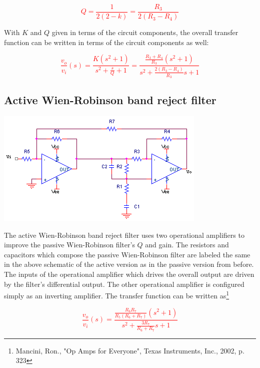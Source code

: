 \textcolor{red}{
\begin{equation}
Q = \frac{1}{2(2-k)} = \frac{R_{3}}{2(R_{3}-R_{4})}
\end{equation}
}

With $K$ and $Q$ given in terms of the circuit components, the overall transfer function can be written in terms of the circuit components as well:

\textcolor{red}{
\begin{equation}
\frac{v_{o}}{v_{i}}(s) = \frac{K(s^{2}+1)}{s^{2}+\frac{s}{Q}+1} =  \frac{\frac{R_{3}+R_{4}}{R_{3}}(s^{2}+1)}{s^{2}+\frac{2(R_{3}-R_{4})}{R_{3}}s+1}
\end{equation}
}

\subsection{Active Wien-Robinson band reject filter}
\begin{center}
	\includegraphics{schematics/activeWien-Robinsonbandrejectfilter.PNG}
\end{center}
The active Wien-Robinson band reject filter uses two operational amplifiers to improve the passive Wien-Robinson filter's $Q$ and gain. The resistors and capacitors which compose the passive Wien-Robinson filter are labeled the same in the above schematic of the active version as in the passive version from before. The inputs of the operational amplifier which drives the overall output are driven by the filter's differential output. The other operational amplifier is configured simply as an inverting amplifier. The transfer function can be written as\footnote{Mancini, Ron., "Op Amps for Everyone", Texas Instruments, Inc., 2002, p. 323}

\textcolor{red}{
\begin{equation}
\frac{v_{o}}{v_{i}}(s) = \frac{\frac{R_{6}R_{7}}{R_{5}(R_{6}+R_{7})}(s^{2}+1)}{s^{2}+\frac{3R_{7}}{R_{6}+R_{7}}s+1}
\label{eq:activeWienRobinsonbandreject}
\end{equation}
}


